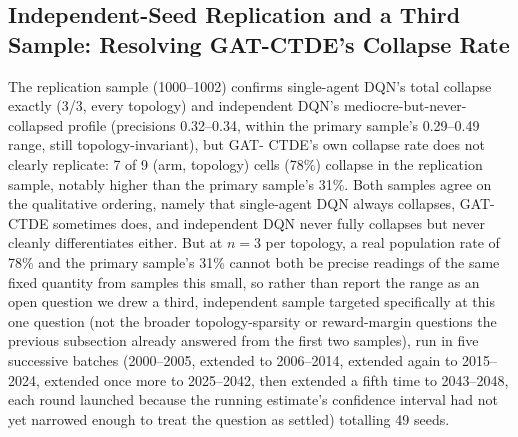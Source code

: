 \documentclass[journal]{IEEEtran}
\begin{document}
\subsection{Independent-Seed Replication and a Third Sample: Resolving GAT-CTDE's Collapse Rate}
The replication sample (1000--1002) confirms single-agent DQN's total
collapse exactly (3/3, every topology) and independent DQN's
mediocre-but-never-collapsed profile (precisions 0.32--0.34, within the
primary sample's 0.29--0.49 range, still topology-invariant), but GAT-
CTDE's own collapse rate does not clearly replicate: 7 of 9 (arm,
topology) cells (78\%) collapse in the replication sample, notably
higher than the primary sample's 31\%. Both samples agree on the
qualitative ordering, namely that single-agent DQN always collapses, GAT-CTDE
sometimes does, and independent DQN never fully collapses but never
cleanly differentiates either. But at $n=3$ per topology, a real
population rate of 78\% and the primary sample's 31\% cannot both be
precise readings of the same fixed quantity from samples this small,
so rather than report the range as an open question we drew a third,
independent sample targeted specifically at this one question (not
the broader topology-sparsity or reward-margin questions the previous
subsection already answered from the first two samples), run in five
successive batches (2000--2005, extended to 2006--2014, extended again
to 2015--2024, extended once more to 2025--2042, then extended a fifth
time to 2043--2048, each round launched because the running estimate's
confidence interval had not yet narrowed enough to treat the question
as settled) totalling 49 seeds.
\end{document}
